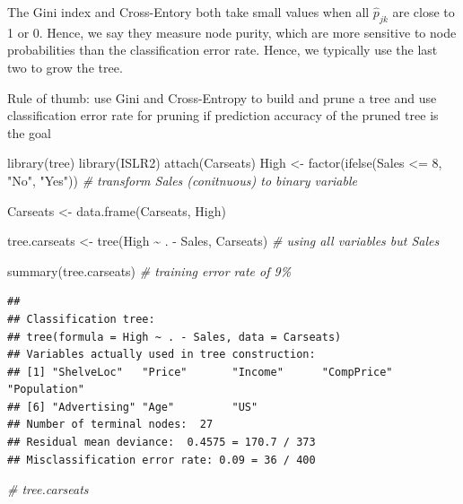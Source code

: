 \documentclass[
]{book}
\newenvironment{Shaded}{\begin{snugshade}}{\end{snugshade}}
\newcommand{\CommentTok}[1]{\textcolor[rgb]{0.56,0.35,0.01}{\textit{#1}}}
\newcommand{\DecValTok}[1]{\textcolor[rgb]{0.00,0.00,0.81}{#1}}
\newcommand{\FunctionTok}[1]{\textcolor[rgb]{0.00,0.00,0.00}{#1}}
\newcommand{\NormalTok}[1]{#1}
\newcommand{\OtherTok}[1]{\textcolor[rgb]{0.56,0.35,0.01}{#1}}
\newcommand{\SpecialCharTok}[1]{\textcolor[rgb]{0.00,0.00,0.00}{#1}}
\newcommand{\StringTok}[1]{\textcolor[rgb]{0.31,0.60,0.02}{#1}}
\begin{document}
The Gini index and Cross-Entory both take small values when all \(\hat{p}_{jk}\) are close to 1 or 0. Hence, we say they measure node purity, which are more sensitive to node probabilities than the classification error rate. Hence, we typically use the last two to grow the tree.

Rule of thumb: use Gini and Cross-Entropy to build and prune a tree and use classification error rate for pruning if prediction accuracy of the pruned tree is the goal

\begin{Shaded}
\begin{Highlighting}[]
\FunctionTok{library}\NormalTok{(tree)}
\FunctionTok{library}\NormalTok{(ISLR2)}
\FunctionTok{attach}\NormalTok{(Carseats)}
\NormalTok{High }\OtherTok{\textless{}{-}} \FunctionTok{factor}\NormalTok{(}\FunctionTok{ifelse}\NormalTok{(Sales }\SpecialCharTok{\textless{}=} \DecValTok{8}\NormalTok{, }\StringTok{"No"}\NormalTok{, }\StringTok{"Yes"}\NormalTok{)) }\CommentTok{\# transform Sales (conitnuous) to binary variable}

\NormalTok{Carseats }\OtherTok{\textless{}{-}} \FunctionTok{data.frame}\NormalTok{(Carseats, High)}

\NormalTok{tree.carseats }\OtherTok{\textless{}{-}} \FunctionTok{tree}\NormalTok{(High }\SpecialCharTok{\textasciitilde{}}\NormalTok{ . }\SpecialCharTok{{-}}\NormalTok{ Sales, Carseats) }\CommentTok{\# using all variables but Sales}

\FunctionTok{summary}\NormalTok{(tree.carseats) }\CommentTok{\# training error rate of 9\%}
\end{Highlighting}
\end{Shaded}

\begin{verbatim}
## 
## Classification tree:
## tree(formula = High ~ . - Sales, data = Carseats)
## Variables actually used in tree construction:
## [1] "ShelveLoc"   "Price"       "Income"      "CompPrice"   "Population" 
## [6] "Advertising" "Age"         "US"         
## Number of terminal nodes:  27 
## Residual mean deviance:  0.4575 = 170.7 / 373 
## Misclassification error rate: 0.09 = 36 / 400
\end{verbatim}

\begin{Shaded}
\begin{Highlighting}[]
\CommentTok{\# tree.carseats}
\end{Highlighting}
\end{Shaded}
\end{document}
